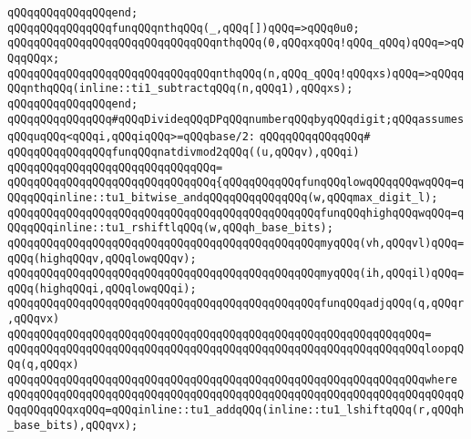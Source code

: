 \verb|qQQqqQQqqQQqqQQqend;|\newline
\newline
\verb|qQQqqQQqqQQqqQQqfunqQQqnthqQQq(_,qQQq[])qQQq=>qQQq0u0;|\newline
\verb|qQQqqQQqqQQqqQQqqQQqqQQqqQQqqQQqnthqQQq(0,qQQqxqQQq!qQQq_qQQq)qQQq=>qQQqqQQqx;|\newline
\verb|qQQqqQQqqQQqqQQqqQQqqQQqqQQqqQQqnthqQQq(n,qQQq_qQQq!qQQqxs)qQQq=>qQQqqQQqnthqQQq(inline::ti1_subtractqQQq(n,qQQq1),qQQqxs);|\newline
\verb|qQQqqQQqqQQqqQQqend;|\newline
\newline
\verb|qQQqqQQqqQQqqQQq#qQQqDivideqQQqDPqQQqnumberqQQqbyqQQqdigit;qQQqassumesqQQquqQQq<qQQqi,qQQqiqQQq>=qQQqbase/2:|\newline
\verb|qQQqqQQqqQQqqQQq#|\newline
\verb|qQQqqQQqqQQqqQQqfunqQQqnatdivmod2qQQq((u,qQQqv),qQQqi)|\newline
\verb|qQQqqQQqqQQqqQQqqQQqqQQqqQQqqQQq=|\newline
\verb|qQQqqQQqqQQqqQQqqQQqqQQqqQQqqQQq{qQQqqQQqqQQqfunqQQqlowqQQqqQQqwqQQq=qQQqqQQqinline::tu1_bitwise_andqQQqqQQqqQQqqQQq(w,qQQqmax_digit_l);|\newline
\verb|qQQqqQQqqQQqqQQqqQQqqQQqqQQqqQQqqQQqqQQqqQQqqQQqfunqQQqhighqQQqwqQQq=qQQqqQQqinline::tu1_rshiftlqQQq(w,qQQqh_base_bits);|\newline
\newline
\verb|qQQqqQQqqQQqqQQqqQQqqQQqqQQqqQQqqQQqqQQqqQQqqQQqmyqQQq(vh,qQQqvl)qQQq=qQQq(highqQQqv,qQQqlowqQQqv);|\newline
\verb|qQQqqQQqqQQqqQQqqQQqqQQqqQQqqQQqqQQqqQQqqQQqqQQqmyqQQq(ih,qQQqil)qQQq=qQQq(highqQQqi,qQQqlowqQQqi);|\newline
\newline
\verb|qQQqqQQqqQQqqQQqqQQqqQQqqQQqqQQqqQQqqQQqqQQqqQQqfunqQQqadjqQQq(q,qQQqr,qQQqvx)|\newline
\verb|qQQqqQQqqQQqqQQqqQQqqQQqqQQqqQQqqQQqqQQqqQQqqQQqqQQqqQQqqQQqqQQq=|\newline
\verb|qQQqqQQqqQQqqQQqqQQqqQQqqQQqqQQqqQQqqQQqqQQqqQQqqQQqqQQqqQQqqQQqloopqQQq(q,qQQqx)|\newline
\verb|qQQqqQQqqQQqqQQqqQQqqQQqqQQqqQQqqQQqqQQqqQQqqQQqqQQqqQQqqQQqqQQqwhere|\newline
\verb|qQQqqQQqqQQqqQQqqQQqqQQqqQQqqQQqqQQqqQQqqQQqqQQqqQQqqQQqqQQqqQQqqQQqqQQqqQQqqQQqxqQQq=qQQqinline::tu1_addqQQq(inline::tu1_lshiftqQQq(r,qQQqh_base_bits),qQQqvx);|\newline
